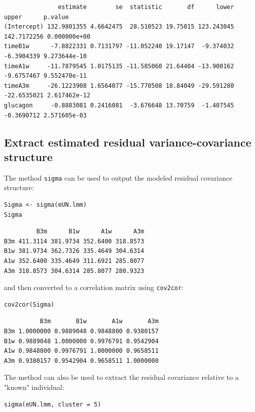 \documentclass[12pt]{article}
\begin{document}
\begin{verbatim}
               estimate        se  statistic       df      lower       upper      p.value
(Intercept) 132.9801355 4.6642475  28.510523 19.75815 123.243045 142.7172256 0.000000e+00
timeB1w      -7.8822331 0.7131797 -11.052240 19.17147  -9.374032  -6.3904339 9.273644e-10
timeA1w     -11.7879545 1.0175135 -11.585060 21.64404 -13.900162  -9.6757467 9.552470e-11
timeA3m     -26.1223908 1.6564077 -15.770508 18.84049 -29.591280 -22.6535021 2.617462e-12
glucagon     -0.8883081 0.2416081  -3.676648 13.70759  -1.407545  -0.3690712 2.571605e-03
\end{verbatim}

\subsection{Extract estimated residual variance-covariance structure}
\label{sec:org7383a47}

The method \texttt{sigma} can be used to output the modeled residual
covariance structure:
\lstset{language=r,label= ,caption= ,captionpos=b,numbers=none}
\begin{lstlisting}
Sigma <- sigma(eUN.lmm)
Sigma
\end{lstlisting}

\begin{verbatim}
         B3m      B1w      A1w      A3m
B3m 411.3114 381.9734 352.6400 318.8573
B1w 381.9734 362.7326 335.4649 304.6314
A1w 352.6400 335.4649 311.6921 285.8077
A3m 318.8573 304.6314 285.8077 280.9323
\end{verbatim}


and then converted to a correlation matrix using \texttt{cov2cor}:
\lstset{language=r,label= ,caption= ,captionpos=b,numbers=none}
\begin{lstlisting}
cov2cor(Sigma)
\end{lstlisting}

\begin{verbatim}
          B3m       B1w       A1w       A3m
B3m 1.0000000 0.9889048 0.9848800 0.9380157
B1w 0.9889048 1.0000000 0.9976791 0.9542904
A1w 0.9848800 0.9976791 1.0000000 0.9658511
A3m 0.9380157 0.9542904 0.9658511 1.0000000
\end{verbatim}


The method can also be used to extract the residual covariance
relative to a "known" individual:
\lstset{language=r,label= ,caption= ,captionpos=b,numbers=none}
\begin{lstlisting}
sigma(eUN.lmm, cluster = 5)
\end{lstlisting}
\end{document}
